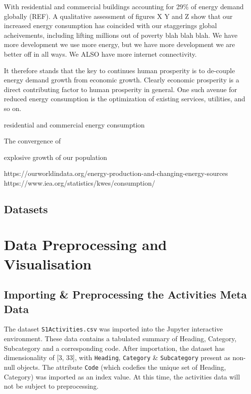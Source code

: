 \documentclass[reprint, floatfix, groupaddress, prb]{revtex4-1}
\begin{document}
With residential and commercial buildings accounting for 29\% of energy
demand globally (REF). A qualitative assessment of figures X Y and Z
show that our increased energy consumption has coincided with our
staggerings global acheivements, including lifting millions out of
poverty blah blah blah. We have more development we use more energy, but
we have more development we are better off in all ways. We ALSO have
more internet connectivity.

It therefore stands that the key to continues human prosperity is to
de-couple energy demand growth from economic growth. Clearly economic
prosperity is a direct contributing factor to human prosperity in
general. One such avenue for reduced energy consumption is the
optimization of existing services, utilities, and so on.

residential and commercial energy consumption

The convergence of

explosive growth of our population

https://ourworldindata.org/energy-production-and-changing-energy-sources
https://www.iea.org/statistics/kwes/consumption/

    

    \hypertarget{datasets}{%
\subsection{Datasets}\label{datasets}}

    \hypertarget{data-preprocessing-and-visualisation}{%
\section{Data Preprocessing and
Visualisation}\label{data-preprocessing-and-visualisation}}

    \hypertarget{importing-preprocessing-the-activities-meta-data}{%
\subsection{Importing \& Preprocessing the Activities Meta
Data}\label{importing-preprocessing-the-activities-meta-data}}

    The dataset \texttt{S1Activities.csv} was imported into the Jupyter
interactive environment. These data contains a tabulated summary of
Heading, Category, Subcategory and a corresponding code. After
importation, the dataset has dimensionality of {[}3, 33{]}, with
\texttt{Heading}, \texttt{Category} \& \texttt{Subcategory} present as
non-null objects. The attribute \texttt{Code} (which codefies the unique
set of Heading, Category) was imported as an index value. At this time,
the activities data will not be subject to preprocessing.
\end{document}

